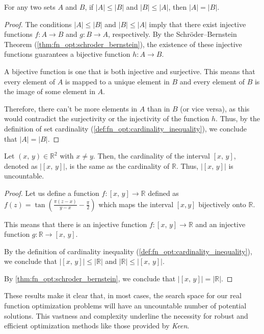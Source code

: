   \begin{corollary}
  \label{cor:fn_opt:cardinality}
    For any two sets \(A\) and \(B\), if \(|A| \leq |B|\) and \(|B| \leq 
    |A|\), then \(|A| = |B|\).
  \end{corollary}

  \begin{proof}
    The conditions \(|A| \leq |B|\) and \(|B| \leq |A|\) imply that there
    exist injective functions \(f: A \rightarrow B\) and \(g: B
    \rightarrow A\), respectively.
    By the Schröder--Bernstein Theorem (\vref{thm:fn_opt:schroder_bernstein}),
    the existence of these injective functions guarantees a bijective function
    \(h: A \rightarrow B\).

    A bijective function is one that is both injective and surjective.
    This means that every element of \(A\) is mapped to a unique element in
    \(B\) and every element of \(B\) is the image of some element in \(A\).

    Therefore, there can't be more elements in \(A\) than in \(B\) (or vice
    versa), as this would contradict the surjectivity or the injectivity of
    the function \(h\).
    Thus, by the definition of set cardinality
    (\vref{def:fn_opt:cardinality_inequality}), we conclude that \(|A| =
    |B|\).
  \end{proof}

  \begin{theorem}
  \label{thm:fn_opt:cardinality}
    Let $(x,\,y) \in \mathbb{R}^2$ with $x \neq y$.
    Then, the cardinality of the interval $[x,\,y]$, denoted as $|[x,\,y]|$,
    is the same as the cardinality of \(\mathbb{R}\).
    Thus, $|[x,\,y]|$ is uncountable.
  \end{theorem}

  \begin{proof}
    Let us define a function \(f: [x,\,y] \rightarrow \mathbb{R}\) defined 
    as \(f(z) = \tan\left(\frac{\pi(z-x)}{y-x} - \frac{\pi}{2}\right)\) 
    which maps the interval \([x, y]\) bijectively onto \(\mathbb{R}\).
    
    This means that there is an injective function \(f: [x,\,y] \rightarrow
    \mathbb{R}\) and an injective function \(g: \mathbb{R} \rightarrow
    [x,\,y]\).

    By the definition of cardinality inequality
    (\vref{def:fn_opt:cardinality_inequality}), we conclude that
    \(|[x,\,y]| \leq |\mathbb{R}|\) and \(|\mathbb{R}| \leq |[x,\,y]|\).

    By \vref{thm:fn_opt:schroder_bernstein}, we conclude that
    \(|[x,\,y]| = |\mathbb{R}|\).
  \end{proof}    

  These results make it clear that, in most cases, the search space for our
  real function optimization problems will have an uncountable number of
  potential solutions.
  This vastness and complexity underline the necessity for robust and
  efficient optimization methods like those provided by \textit{Keen}.